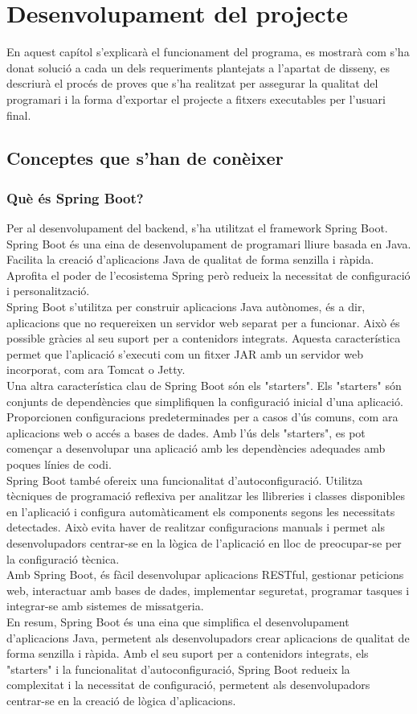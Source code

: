 \chapter{Desenvolupament del projecte}
En aquest capítol s'explicarà el funcionament del programa, es mostrarà com s'ha donat solució a cada un dels requeriments plantejats a l'apartat de disseny, es descriurà el procés de proves que s'ha realitzat per assegurar la qualitat del programari i la forma d'exportar el projecte a fitxers executables per l'usuari final.
\section{Conceptes que s'han de conèixer}
\subsection{Què és Spring Boot?}
Per al desenvolupament del backend, s'ha utilitzat el framework Spring Boot. Spring Boot és una eina de desenvolupament de programari lliure basada en Java. Facilita la creació d'aplicacions Java de qualitat de forma senzilla i ràpida. Aprofita el poder de l'ecosistema Spring però redueix la necessitat de configuració i personalització.
\\[3mm]
Spring Boot s'utilitza per construir aplicacions Java autònomes, és a dir, aplicacions que no requereixen un servidor web separat per a funcionar. Això és possible gràcies al seu suport per a contenidors integrats. Aquesta característica permet que l'aplicació s'executi com un fitxer JAR amb un servidor web incorporat, com ara Tomcat o Jetty.
\\[3mm]
Una altra característica clau de Spring Boot són els "starters". Els "starters" són conjunts de dependències que simplifiquen la configuració inicial d'una aplicació. Proporcionen configuracions predeterminades per a casos d'ús comuns, com ara aplicacions web o accés a bases de dades. Amb l'ús dels "starters", es pot començar a desenvolupar una aplicació amb les dependències adequades amb poques línies de codi.
\\[3mm]
Spring Boot també ofereix una funcionalitat d'autoconfiguració. Utilitza tècniques de programació reflexiva per analitzar les llibreries i classes disponibles en l'aplicació i configura automàticament els components segons les necessitats detectades. Això evita haver de realitzar configuracions manuals i permet als desenvolupadors centrar-se en la lògica de l'aplicació en lloc de preocupar-se per la configuració tècnica.
\\[3mm]
Amb Spring Boot, és fàcil desenvolupar aplicacions RESTful, gestionar peticions web, interactuar amb bases de dades, implementar seguretat, programar tasques i integrar-se amb sistemes de missatgeria.
\\[3mm]
En resum, Spring Boot és una eina que simplifica el desenvolupament d'aplicacions Java, permetent als desenvolupadors crear aplicacions de qualitat de forma senzilla i ràpida. Amb el seu suport per a contenidors integrats, els "starters" i la funcionalitat d'autoconfiguració, Spring Boot redueix la complexitat i la necessitat de configuració, permetent als desenvolupadors centrar-se en la creació de lògica d'aplicacions.
